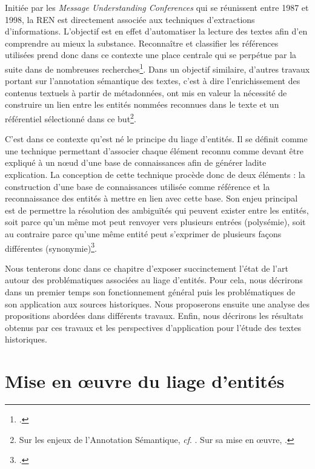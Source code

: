 \documentclass[a4paper,12pt,twoside]{book}
\begin{document}
	Initiée par les \textit{Message Understanding Conferences} qui se réunissent entre 1987 et 1998, la REN est directement associée aux techniques d'extractions d'informations. L'objectif est en effet d'automatiser la lecture des textes afin d'en comprendre au mieux la substance. Reconnaître et classifier les références utilisées prend donc dans ce contexte une place centrale qui se perpétue par la suite dans de nombreuses recherches\footcite[p. 17--19]{ehrmann_les_2008}. Dans un objectif similaire, d'autres travaux portant sur l'annotation sémantique des textes, c'est à dire l'enrichissement des contenus textuels à partir de métadonnées, ont mis en valeur la nécessité de construire un lien entre les entités nommées reconnues dans le texte et un référentiel sélectionné dans ce but\footnote{Sur les enjeux de l'Annotation Sémantique, \textit{cf}. \cite[p. 15--16]{stern_identification_2013}. Sur sa mise en œuvre, \cite[p. 96--99]{stern_identification_2013}.}.
	
	C'est dans ce contexte qu'est né le principe du liage d'entités. Il se définit comme une technique permettant d'associer chaque élément reconnu comme devant être expliqué à un nœud d'une base de connaissances afin de générer ladite explication. La conception de cette technique procède donc de deux éléments : la construction d'une base de connaissances utilisée comme référence et la reconnaissance des entités à mettre en lien avec cette base. Son enjeu principal est de permettre la résolution des ambiguïtés qui peuvent exister entre les entités, soit parce qu'un même mot peut renvoyer vers plusieurs entrées (polysémie), soit au contraire parce qu'une même entité peut s'exprimer de plusieurs façons différentes (synonymie)\footcite[p. 110--114]{stern_identification_2013}.
	
	Nous tenterons donc dans ce chapitre d'exposer succinctement l'état de l'art autour des  problématiques associées au liage d'entités. Pour cela, nous décrirons dans un premier temps son fonctionnement général puis les problématiques de son application aux sources historiques. Nous proposerons ensuite une analyse des propositions abordées dans différents travaux. Enfin, nous décrirons les résultats obtenus par ces travaux et les perspectives d'application pour l'étude des textes historiques.
	
	
	\section{Mise en œuvre du liage d'entités}
	
\end{document}
